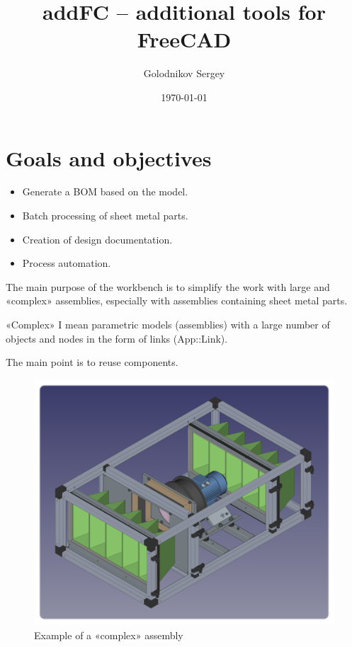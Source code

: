 \documentclass[a4paper,12pt]{article}
\title{addFC -- additional tools for FreeCAD}
\author{Golodnikov Sergey}
\date{\today}
\begin{document}
\maketitle




\section{Goals and objectives}

\begin{itemize}
	\item Generate a BOM based on the model.
	\item Batch processing of sheet metal parts.
	\item Creation of design documentation.
	\item Process automation.
\end{itemize}

The main purpose of the workbench is to simplify the work with large and «complex» assemblies, especially with assemblies containing sheet metal parts.

«Complex» I mean parametric models (assemblies) with a large number of objects and nodes in the form of links (App::Link).

The main point is to reuse components.

\begin{figure}[htp]
	\centering
	\includegraphics[scale=0.48]{img/assembly_example.png}
	\caption{Example of a «complex» assembly}
	\label{sec:assembly_example}
\end{figure}
\end{document}
